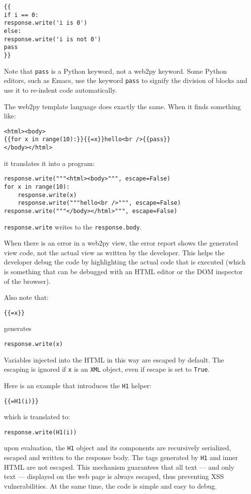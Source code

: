 \documentclass[justified,sixbynine,notoc]{tufte-book}
\def\ft{\small\tt}
\def\inxx#1{\index{#1}}
\begin{document}
\begin{fullwidth}
\begin{lstlisting}[keywords={}]
{{
if i == 0:
response.write('i is 0')
else:
response.write('i is not 0')
pass
}}
\end{lstlisting}

Note that {\ft pass} is a Python keyword, not a web2py keyword. Some Python editors, such as Emacs, use the keyword {\ft pass} to signify the division of blocks and use it to re-indent code automatically.

The web2py template language does exactly the same. When it finds something like:

\begin{lstlisting}[keywords={}]
<html><body>
{{for x in range(10):}}{{=x}}hello<br />{{pass}}
</body></html>
\end{lstlisting}
\noindent it translates it into a program:
\begin{lstlisting}
response.write("""<html><body>""", escape=False)
for x in range(10):
    response.write(x)
    response.write("""hello<br />""", escape=False)
response.write("""</body></html>""", escape=False)
\end{lstlisting}
{\ft response.write} writes to the {\ft response.body}.

When there is an error in a web2py view, the error report shows the generated view code, not the actual view as written by the developer. This helps the developer debug the code by highlighting the actual code that is executed (which is something that can be debugged with an HTML editor or the DOM inspector of the browser).

Also note that:
\begin{lstlisting}[keywords={}]
{{=x}}
\end{lstlisting}
\noindent generates
\inxx{response.write} \inxx{escape}
\begin{lstlisting}
response.write(x)
\end{lstlisting}

Variables injected into the HTML in this way are escaped by default.
The escaping is ignored if {\ft x} is an {\ft XML} object, even if escape is set to {\ft True}.

Here is an example that introduces the {\ft H1} helper:
\begin{lstlisting}[keywords={}]
{{=H1(i)}}
\end{lstlisting}
\noindent which is translated to:
\begin{lstlisting}
response.write(H1(i))
\end{lstlisting}
\noindent upon evaluation, the {\ft H1} object and its components are recursively serialized, escaped and written to the response body. The tags generated by {\ft H1} and inner HTML are not escaped. This mechanism guarantees that all text --- and only text --- displayed on the web page is always escaped, thus preventing XSS vulnerabilities. At the same time, the code is simple and easy to debug.


\end{fullwidth}
\end{document}
